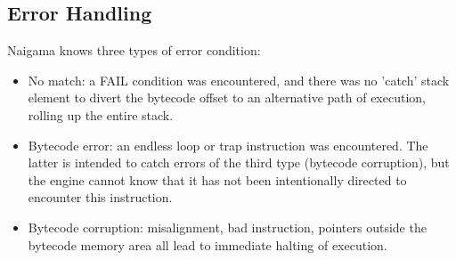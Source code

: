 \subsection{Error Handling}

Naigama knows three types of error condition:

\begin{itemize}
\item No match: a FAIL condition was encountered, and there was no 'catch' stack
element to divert the bytecode offset to an alternative path of execution,
rolling up the entire stack.
\item Bytecode error: an endless loop or trap instruction was encountered.
The latter is intended to catch errors of the third type (bytecode corruption),
but the engine cannot know that it has not been intentionally directed to
encounter this instruction.
\item Bytecode corruption: misalignment, bad instruction, pointers outside
the bytecode memory area all lead to immediate halting of execution.
\end{itemize}
